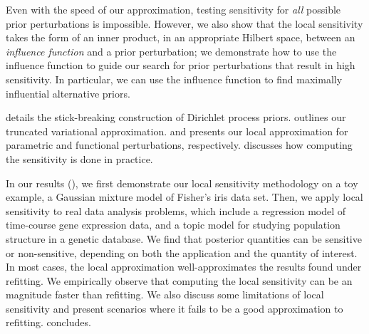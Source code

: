 Even with the speed of our approximation,
testing sensitivity for \textit{all} possible prior perturbations
is impossible.
However, we also show that the local sensitivity takes the form of an inner product,
in an appropriate Hilbert space, between an \textit{influence function}
and a prior perturbation;
we demonstrate how to use the influence function to guide our
search for prior perturbations that result in high sensitivity.
In particular, we can use the influence function to find maximally influential alternative
priors.

 details the stick-breaking construction of Dirichlet process priors.
 outlines our truncated variational approximation.
 and  presents our
local approximation for parametric
and functional perturbations, respectively.
 discusses how computing the sensitivity is done in practice.

In our results (),
we first demonstrate our local sensitivity methodology on
a toy example, a Gaussian mixture model
of Fisher's iris data set.
Then, we apply local sensitivity to real data analysis problems, which include a
regression model of time-course gene expression data,
and a topic model for studying population structure in a genetic database.
We find that posterior quantities can be sensitive or non-sensitive,
depending on both the application and the quantity of interest.
In most cases, the local approximation well-approximates the results found under
refitting.
We empirically observe that computing the local sensitivity
can be an magnitude faster than refitting.
We also discuss some limitations of local sensitivity
and present scenarios where it fails to be a good approximation to refitting.
 concludes.
